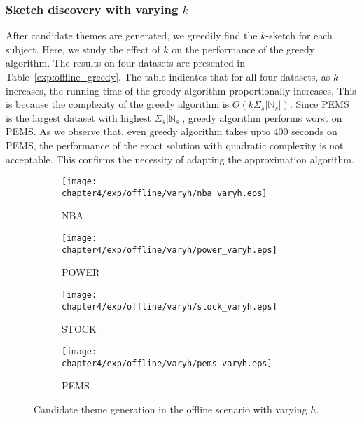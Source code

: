 \subsubsection{Sketch discovery with varying $k$}
After candidate themes are generated, we greedily find the $k$-sketch for each subject. 
Here, we study the effect of $k$ on the performance of the greedy algorithm. The results on four datasets are presented in Table~\ref{exp:offline_greedy}. The table indicates that for all four datasets, as $k$ increases, the running time of the greedy algorithm proportionally increases. This is because the complexity of the greedy algorithm is $O(k\Sigma_s|\mathbb{N}_s|)$. Since PEMS is the largest dataset with highest $\Sigma_s|\mathbb{N}_s|$, greedy algorithm performs worst on PEMS. As we observe that, even greedy algorithm takes upto 400 seconds on PEMS, the performance of the exact solution with quadratic complexity is not acceptable. This confirms the necessity of adapting the approximation algorithm.
%




\begin{figure*}[t]
\centering
    \begin{subfigure}[b]{0.45\textwidth}
        \texttt{[image: chapter4/exp/offline/varyh/nba\_varyh.eps]}
        \caption{NBA}
    \end{subfigure}
    \begin{subfigure}[b]{0.45\textwidth}
        \texttt{[image: chapter4/exp/offline/varyh/power\_varyh.eps]}
        \caption{POWER}
    \end{subfigure}
    \begin{subfigure}[b]{0.45\textwidth}
        \texttt{[image: chapter4/exp/offline/varyh/stock\_varyh.eps]}
        \caption{STOCK}
    \end{subfigure}
    \begin{subfigure}[b]{0.45\textwidth}
        \texttt{[image: chapter4/exp/offline/varyh/pems\_varyh.eps]}
        \caption{PEMS}
    \end{subfigure}
\caption{Candidate theme generation in the offline scenario with varying $h$.}
\label{exp:offline_performance_vary_n}
\end{figure*}

